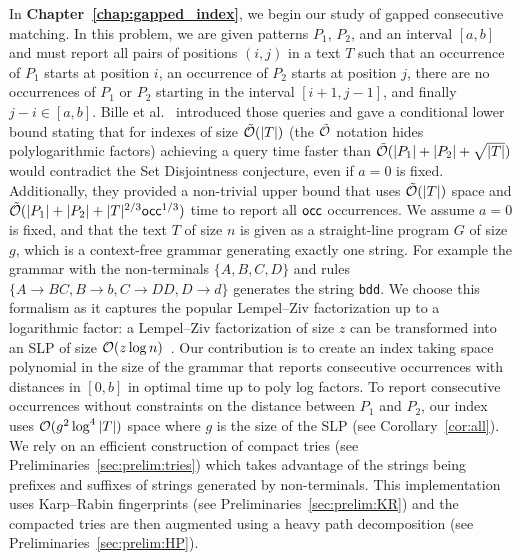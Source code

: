 In \textbf{Chapter~\ref{chap:gapped_index}}, we begin our study of gapped consecutive matching. In this problem, we are given patterns $P_1$, $P_2$, and an interval $[a,b]$ and must report all pairs of positions $(i,j)$ in a text $T$ such that an occurrence of $P_1$ starts at position $i$, an occurrence of $P_2$ starts at position $j$, there are no occurrences of $P_1$ or $P_2$ starting in the interval $[i+1,j-1]$, and finally $j-i \in [a,b]$.
Bille et al.~\cite{bille2022gapped} introduced those queries and gave a conditional lower bound stating that for indexes of size $\tilde {\mathcal{O}}(|T|)$ (the $\tilde {\mathcal{O}}$ notation hides polylogarithmic factors) achieving a query time faster than $\tilde {\mathcal{O}}(|P_1|+|P_2|+\sqrt{|T|})$ would contradict the Set Disjointness conjecture, even if $a=0$ is fixed. Additionally, they provided a non-trivial upper bound that uses $\tilde {\mathcal{O}}(|T|)$ space and $\tilde {\mathcal{O}} (|P_1| +|P_2| + |T|^{2/3}\mathsf{occ}^{1/3})$ time to report all $\mathsf{occ}$ occurrences. 
We assume $a=0$ is fixed, and that the text $T$ of size $n$ is given as a straight-line program $G$ of size $g$, which is a context-free grammar generating exactly one string. For example the grammar with the non-terminals $\{A,B,C,D\}$ and rules $\{A \rightarrow BC, B \rightarrow b, C \rightarrow DD, D\rightarrow d \}$ generates the string \texttt{bdd}.
We choose this formalism 
as it captures the popular Lempel--Ziv factorization up to a logarithmic factor: a Lempel--Ziv factorization of size $z$ can be transformed into an SLP of size $\mathcal{O}(z\log n)$~\cite{CharikarLLPPRSS02,Rytter02}.
%
Our contribution is to create an index taking space polynomial in the size of the grammar that reports consecutive occurrences with distances in $[0,b]$ in optimal time up to poly log factors.
To report consecutive occurrences without constraints on the distance between $P_1$ and $P_2$, our index uses $\mathcal{O}(g^2\log^4|T|)$ space where $g$ is the size of the SLP (see Corollary~\ref{cor:all}).
We rely on an efficient construction of compact tries (see Preliminaries~\ref{sec:prelim:tries}) which takes advantage of the strings being prefixes and suffixes of strings generated by non-terminals. This implementation uses Karp--Rabin fingerprints (see Preliminaries~\ref{sec:prelim:KR}) and the compacted tries are then augmented using a heavy path decomposition (see Preliminaries~\ref{sec:prelim:HP}).
